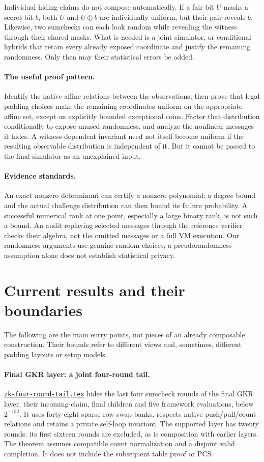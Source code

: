 \documentclass[11pt]{article}
\theoremstyle{definition}
\newcommand{\researchnote}[1]{\href{../#1.tex}{\nolinkurl{#1.tex}}}
\begin{document}
Individual hiding claims do not compose automatically. If a fair bit $U$ masks a secret bit $b$, both $U$ and $U\oplus b$ are individually uniform, but their pair reveals $b$. Likewise, two sumchecks can each look random while revealing the witness through their shared masks. What is needed is a joint simulator, or conditional hybrids that retain every already exposed coordinate and justify the remaining randomness. Only then may their statistical errors be added.

\paragraph{The useful proof pattern.} Identify the native affine relations between the observations, then prove that legal padding choices make the remaining coordinates uniform on the appropriate affine set, except on explicitly bounded exceptional coins. Factor that distribution conditionally to expose unused randomness, and analyze the nonlinear messages it hides. A witness-dependent invariant need not itself become uniform if the resulting observable distribution is independent of it. But it cannot be passed to the final simulator as an unexplained input.

\paragraph{Evidence standards.} An exact nonzero determinant can certify a nonzero polynomial; a degree bound and the actual challenge distribution can then bound its failure probability. A successful numerical rank at one point, especially a large binary rank, is not such a bound. An audit replaying selected messages through the reference verifier checks their algebra, not the omitted messages or a full VM execution. Our randomness arguments use genuine random choices; a pseudorandomness assumption alone does not establish statistical privacy.

\section{Current results and their boundaries}\label{sec:zk-status}

The following are the main entry points, not pieces of an already composable construction. Their bounds refer to different views and, sometimes, different padding layouts or setup models.

\paragraph{Final GKR layer: a joint four-round tail.} \researchnote{zk-four-round-tail} hides the last four sumcheck rounds of the final GKR layer, their incoming claim, final children and five framework evaluations, below $2^{-152}$. It uses forty-eight sparse row-swap banks, respects native push/pull/count relations and retains a private self-loop invariant. The supported layer has twenty rounds: its first sixteen rounds are excluded, as is composition with earlier layers. The theorem assumes compatible count normalization and a disjoint valid completion. It does not include the subsequent table proof or PCS.
\end{document}
